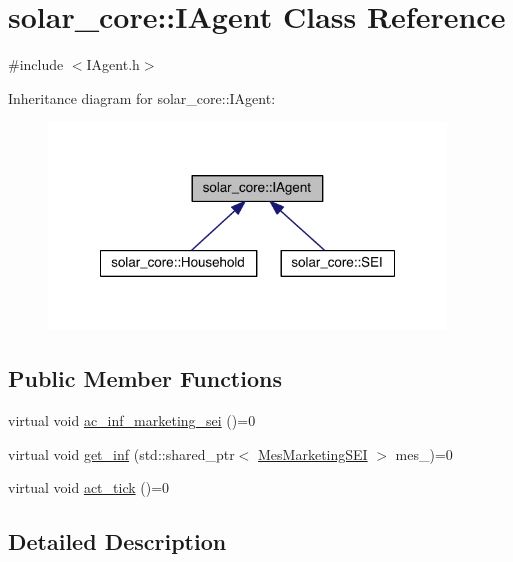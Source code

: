 \hypertarget{classsolar__core_1_1_i_agent}{}\section{solar\+\_\+core\+:\+:I\+Agent Class Reference}
\label{classsolar__core_1_1_i_agent}


{\ttfamily \#include $<$I\+Agent.\+h$>$}



Inheritance diagram for solar\+\_\+core\+:\+:I\+Agent\+:\nopagebreak
\begin{figure}[H]
\begin{center}
\leavevmode
\includegraphics[width=299pt]{classsolar__core_1_1_i_agent__inherit__graph}
\end{center}
\end{figure}
\subsection*{Public Member Functions}
\begin{DoxyCompactItemize}
\item 
virtual void \hyperlink{classsolar__core_1_1_i_agent_a0333116b8ef74f3321ce7acff5d5332e}{ac\+\_\+inf\+\_\+marketing\+\_\+sei} ()=0
\item 
virtual void \hyperlink{classsolar__core_1_1_i_agent_aa9ebc762ed032f7084063199747decb6}{get\+\_\+inf} (std\+::shared\+\_\+ptr$<$ \hyperlink{classsolar__core_1_1_mes_marketing_s_e_i}{Mes\+Marketing\+S\+E\+I} $>$ mes\+\_\+)=0
\item 
virtual void \hyperlink{classsolar__core_1_1_i_agent_a6813e8e4f94ab2dc917a29c4d6609149}{act\+\_\+tick} ()=0
\end{DoxyCompactItemize}


\subsection{Detailed Description}


